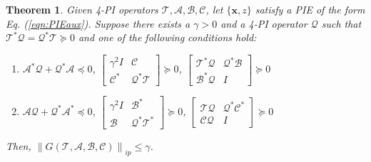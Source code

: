 \documentclass[letterpaper, 10 pt, conference]{ieeeconf}
\newcommand{\mcl}[1]{\mathcal{#1}}
\newcommand{\mbf}[1]{\mathbf{#1}}
\newcommand{\norm}[1]{\left\lVert #1 \right\rVert}
\newtheorem{theorem}{Theorem} %
\theoremstyle{definition}
\begin{document}
\begin{theorem}\label{thm:Normnoncoercive}
    Given 4-PI operators ${\mathcal{T}, \mathcal{A},\mathcal{B},\mathcal{C}}$, let $\{\mbf x, z\}$ satisfy a PIE of the form Eq. (\ref{eqn:PIEaux}).
    Suppose there exists a $\gamma > 0$ and a 4-PI operator $\mcl Q$ such that $\mcl T^*\mcl Q =\mcl Q^* \mcl T \succeq 0$ and one of the following conditions hold:
    \begin{enumerate}
        \item[(i)] $\mcl A^*\mcl Q+\mcl Q^*\mcl A \!\preceq\! 0$, $ \begin{bmatrix}
            \gamma^2I & \mcl C\\ \mcl C^* & \mcl Q^* \mcl  T 
        \end{bmatrix}\!\succeq\! 0$, $ \begin{bmatrix}
            \mcl T^*\mcl Q & \mcl Q^* \mcl B\\ \mcl B^* \mcl Q & I
        \end{bmatrix}\!\succeq\! 0$ 
        \item[(ii)] $\mcl A\mcl Q+\mcl Q^*\mcl A^* \!\preceq\! 0$, $ \begin{bmatrix}
            \gamma^2I \!\!& \mcl B^*\\ \mcl B \!\!& \mcl Q^* \mcl  T^*
        \end{bmatrix}\!\succeq\! 0$, $ \begin{bmatrix}
            \mcl T\mcl Q & \mcl Q^* \mcl C^*\\ \mcl C \mcl Q & I
        \end{bmatrix}\!\succeq\! 0$ 
    \end{enumerate} 
    Then, $\norm{G(\mcl T, \mcl A,\mcl B,\mcl C)}_{ip} \le \gamma$.
\end{theorem}
\end{document}
